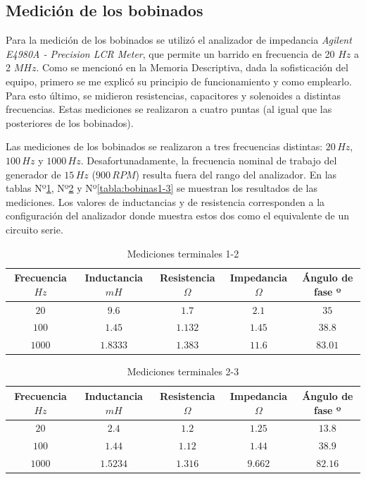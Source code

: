 \documentclass[a4paper,11pt,twoside]{IT-CNEA}
\begin{document}
\subsection{Medición de los bobinados}
Para la medición de los bobinados se utilizó el analizador de impedancia \textit{Agilent E4980A - Precision LCR Meter}, que permite un barrido en frecuencia de 20 $Hz$ a 2 $MHz$. Como se mencionó en la Memoria Descriptiva, dada la sofisticación del equipo, primero se me explicó su principio de funcionamiento y como emplearlo. Para esto último, se midieron resistencias, capacitores y solenoides a distintas frecuencias. Estas mediciones se realizaron a cuatro puntas (al igual que las posteriores de los bobinados).
\par Las mediciones de los bobinados se realizaron a tres frecuencias distintas: $20\,Hz$, $100\,Hz$ y $1000\,Hz$. Desafortunadamente, la frecuencia nominal de trabajo del generador de $15\,Hz$ ($900\,RPM$) resulta fuera del rango del analizador. En las tablas Nº\ref{tabla:bobinas1-2}, Nº\ref{tabla:bobinas2-3} y Nº\ref{tabla:bobinas1-3} se muestran los resultados de las mediciones. Los valores de inductancias y de resistencia corresponden a la configuración del analizador donde muestra estos dos como el equivalente de un circuito serie. 
\begin{table}[h!]
\centering
\caption{Mediciones terminales 1-2}
\label{tabla:bobinas1-2}
\begin{tabular}{|c|c|c|c|c|}
\hline
Frecuencia $Hz$ & Inductancia $mH$ & Resistencia $\varOmega$ & Impedancia $\varOmega$ & Ángulo de fase º \\ \hline 
$20$&$9.6$&$1.7$&$2.1$&$35$  \\ \hline
$100$&$1.45$&$1.132$&$1.45$&$38.8$  \\ \hline
$1000$&$1.8333$&$1.383$&$11.6$&$83.01$  \\ \hline
\end{tabular}
\end{table}
\begin{table}[h!]
\centering
\caption{Mediciones terminales 2-3}
\label{tabla:bobinas2-3}
\begin{tabular}{|c|c|c|c|c|}
\hline
Frecuencia $Hz$ & Inductancia $mH$ & Resistencia $\varOmega$ & Impedancia $\varOmega$ & Ángulo de fase º \\ \hline 
$20$&$2.4$&$1.2$&$1.25$&$13.8$  \\ \hline
$100$&$1.44$&$1.12$&$1.44$&$38.9$  \\ \hline
$1000$&$1.5234$&$1.316$&$9.662$&$82.16$  \\ \hline
\end{tabular}
\end{table}
\end{document}
